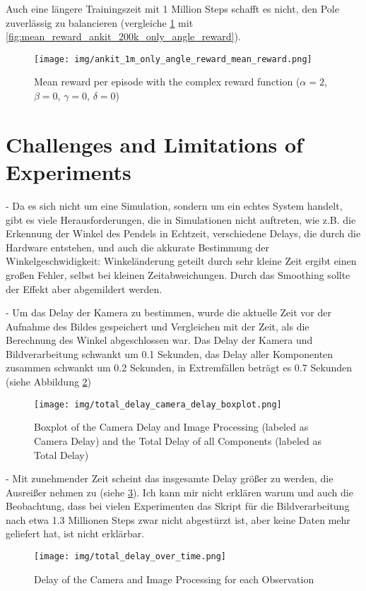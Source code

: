 Auch eine längere Trainingszeit mit 1 Million Steps schafft es nicht, den Pole zuverlässig zu balancieren (vergleiche \ref{fig:mean_reward_ankit_1m_only_angle_reward} mit \ref{fig:mean_reward_ankit_200k_only_angle_reward}).
\begin{figure}[htbp]
    \centering
    \texttt{[image: img/ankit\_1m\_only\_angle\_reward\_mean\_reward.png]}
    \caption{Mean reward per episode with the complex reward function ($\alpha=2$, $\beta=0$, $\gamma=0$, $\delta=0$)}
    \label{fig:mean_reward_ankit_1m_only_angle_reward}
\end{figure}

\section{Challenges and Limitations of Experiments}
- Da es sich nicht um eine Simulation, sondern um ein echtes System handelt, gibt es viele Herausforderungen, die in Simulationen nicht auftreten, wie z.B. die Erkennung der Winkel des Pendels in Echtzeit, verschiedene Delays, die durch die Hardware entstehen, und auch die akkurate Bestimmung der Winkelgeschwidigkeit: Winkeländerung geteilt durch sehr kleine Zeit ergibt einen großen Fehler, selbst bei kleinen Zeitabweichungen. Durch das Smoothing sollte der Effekt aber abgemildert werden.

- Um das Delay der Kamera zu bestimmen, wurde die aktuelle Zeit vor der Aufnahme des Bildes gespeichert und Vergleichen mit der Zeit, als die Berechnung des Winkel abgeschlossen war. Das Delay der Kamera und Bildverarbeitung schwankt um 0.1 Sekunden, das Delay aller Komponenten zusammen schwankt um 0.2 Sekunden, in Extremfällen beträgt es 0.7 Sekunden (siehe Abbildung \ref{fig:camera_delay_boxplot})
\begin{figure}
    \centering
    \texttt{[image: img/total\_delay\_camera\_delay\_boxplot.png]}
    \caption{Boxplot of the Camera Delay and Image Processing (labeled as Camera Delay) and the Total Delay of all Components (labeled as Total Delay)}
    \label{fig:camera_delay_boxplot}
\end{figure}
- Mit zunehmender Zeit scheint das insgesamte Delay größer zu werden, die Ausreißer nehmen zu (siehe \ref{fig:total_delay_over_time}). Ich kann mir nicht erklären warum und auch die Beobachtung, dass bei vielen Experimenten das Skript für die Bildverarbeitung nach etwa 1.3 Millionen Steps zwar nicht abgestürzt ist, aber keine Daten mehr geliefert hat, ist nicht erklärbar.
\begin{figure}
    \centering
    \texttt{[image: img/total\_delay\_over\_time.png]}
    \caption{Delay of the Camera and Image Processing for each Observation}
    \label{fig:total_delay_over_time}
\end{figure}
